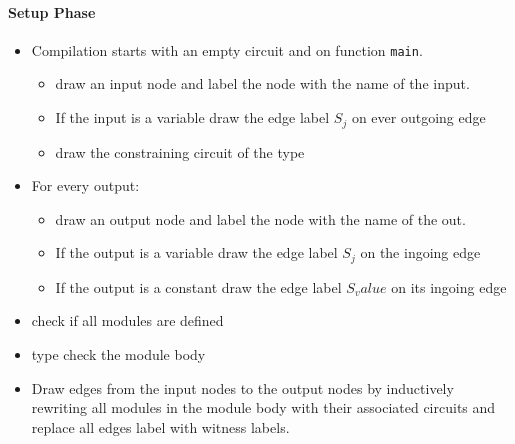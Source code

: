 \paragraph{Setup Phase}
\begin{itemize}
\item Compilation starts with an empty circuit and on function \texttt{main}.
\begin{itemize}
\item  draw an input node and label the node with the name of the input.
\item If the input is a variable draw the edge label $S_j$ on ever outgoing edge
\item draw the constraining circuit of the type
\end{itemize}
\item For every output:
\begin{itemize}
\item  draw an output node and label the node with the name of the out.
\item If the output is a variable draw the edge label $S_j$ on the ingoing edge
\item If the output is a constant draw the edge label $S_value$ on its ingoing edge
\end{itemize}
\item check if all modules are defined
\item type check the module body 
\item Draw edges from the input nodes to the output nodes by inductively rewriting all modules in the module body with their associated circuits and replace all edges label with witness labels.
\end{itemize}
